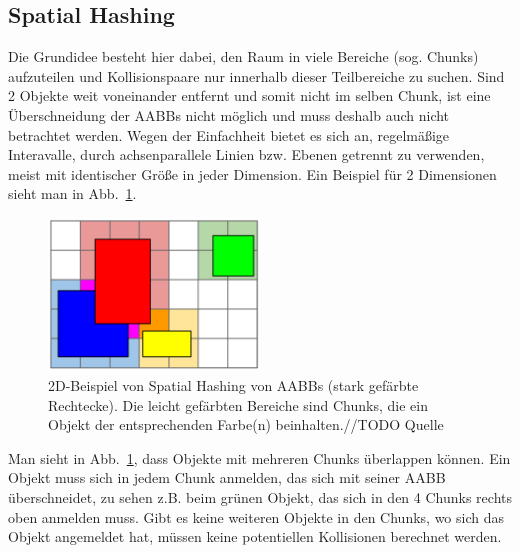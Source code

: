 \subsection{Spatial Hashing}
\label{sec:spatialHashing}
Die Grundidee besteht hier dabei, den Raum in viele Bereiche (sog. Chunks) aufzuteilen und Kollisionspaare nur innerhalb dieser Teilbereiche zu suchen. Sind 2 Objekte weit voneinander entfernt und somit nicht im selben Chunk, ist eine Überschneidung der AABBs nicht möglich und muss deshalb auch nicht betrachtet werden. Wegen der Einfachheit bietet es sich an, regelmäßige Interavalle, durch achsenparallele Linien bzw. Ebenen getrennt zu verwenden, meist mit identischer Größe in jeder Dimension. Ein Beispiel für 2 Dimensionen sieht man in Abb.~\ref{fig:spatialHashing}.

\begin{figure}
    \centering
    \includegraphics[width=0.5\textwidth]{./res/spatialHashingAABB.png}
    \caption{2D-Beispiel von Spatial Hashing von AABBs (stark gefärbte Rechtecke). Die leicht gefärbten Bereiche sind Chunks, die ein Objekt der entsprechenden Farbe(n) beinhalten.//TODO Quelle}
    \label{fig:spatialHashing}
\end{figure}

Man sieht in Abb.~\ref{fig:spatialHashing}, dass Objekte mit mehreren Chunks überlappen können. Ein Objekt muss sich in jedem Chunk anmelden, das sich mit seiner AABB überschneidet, zu sehen z.B. beim grünen Objekt, das sich in den 4 Chunks rechts oben anmelden muss. Gibt es keine weiteren Objekte in den Chunks, wo sich das Objekt angemeldet hat, müssen keine potentiellen Kollisionen berechnet werden.\\

